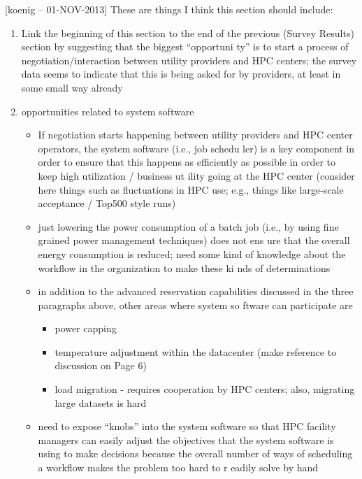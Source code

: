 \documentclass{llncs}
\begin{document}
[koenig -- 01-NOV-2013] These are things I think this section should
include:

\begin{enumerate}
\item Link the beginning of this section to the end of the previous (Survey Results) section by suggesting that the biggest ``opportuni
ty'' is to start a process of negotiation/interaction between utility providers and HPC centers; the survey data seems to indicate that
 this is being asked for by providers, at least in some small way already
\item opportunities related to system software
        \begin{itemize}
        \item If negotiation starts happening between utility providers and HPC center operators, the system software (i.e., job schedu
ler) is a key component in order to ensure that this happens as efficiently as possible in order to keep high utilization / business ut
ility going at the HPC center (consider here things such as fluctuations in HPC use; e.g., things like large-scale acceptance / Top500
style runs)
        \item just lowering the power consumption of a batch job (i.e., by using fine grained power management techniques) does not ens
ure that the overall energy consumption is reduced; need some kind of knowledge about the workflow in the organization to make these ki
nds of determinations
        \item in addition to the advanced reservation capabilities discussed in the three paragraphs above, other areas where system so
ftware can participate are
                \begin{itemize}
                \item power capping
                \item temperature adjustment within the datacenter (make reference to discussion on Page 6)
                \item load migration - requires cooperation by HPC centers; also, migrating large datasets is hard
                \end{itemize}
        \item need to expose ``knobs'' into the system software so that HPC facility managers can easily adjust the objectives that the
 system software is using to make decisions because the overall number of ways of scheduling a workflow makes the problem too hard to r
eadily solve by hand
        \end{itemize}

\end{enumerate}
\end{document}
